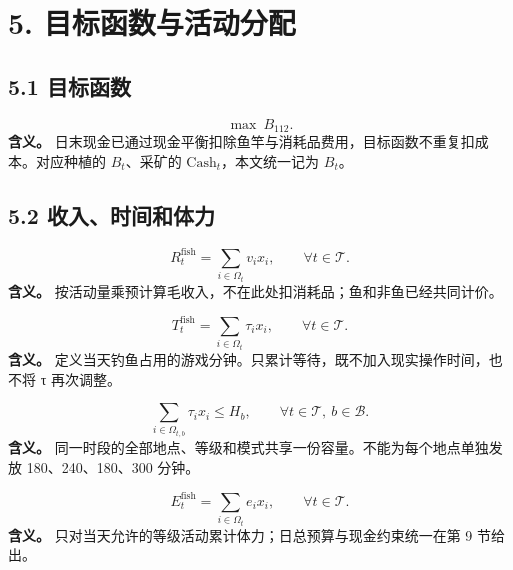 \documentclass[11pt,a4paper]{article}
\begin{document}
\section*{\color{modelblue}5. 目标函数与活动分配}

\subsection*{5.1 目标函数}

\begin{samepage}
\[
\max\ B_{112}. \tag{O1}
\]
\textbf{含义。} 日末现金已通过现金平衡扣除鱼竿与消耗品费用，目标函数不重复扣成本。对应种植的 $B_t$、采矿的 $\mathrm{Cash}_t$，本文统一记为 $B_t$。\par
\end{samepage}

\subsection*{5.2 收入、时间和体力}

\begin{samepage}
\[
R_t^{\mathrm{fish}}=\sum_{i\in\Omega_t}v_ix_i,\qquad \forall t\in\mathcal T. \tag{C1}
\]
\textbf{含义。} 按活动量乘预计算毛收入，不在此处扣消耗品；鱼和非鱼已经共同计价。\par
\end{samepage}

\begin{samepage}
\[
T_t^{\mathrm{fish}}=\sum_{i\in\Omega_t}\tau_ix_i,\qquad \forall t\in\mathcal T. \tag{C2}
\]
\textbf{含义。} 定义当天钓鱼占用的游戏分钟。只累计等待，既不加入现实操作时间，也不将 τ 再次调整。\par
\end{samepage}

\begin{samepage}
\[
\sum_{i\in\Omega_{t,b}}\tau_ix_i\le H_b,
\qquad \forall t\in\mathcal T,\ b\in\mathcal B. \tag{C3}
\]
\textbf{含义。} 同一时段的全部地点、等级和模式共享一份容量。不能为每个地点单独发放 180、240、180、300 分钟。\par
\end{samepage}

\begin{samepage}
\[
E_t^{\mathrm{fish}}=\sum_{i\in\Omega_t}e_ix_i,\qquad \forall t\in\mathcal T. \tag{C4}
\]
\textbf{含义。} 只对当天允许的等级活动累计体力；日总预算与现金约束统一在第 9 节给出。\par
\end{samepage}
\end{document}
